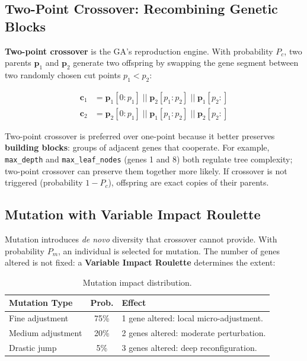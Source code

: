 \documentclass[12pt, a4paper]{article}
\begin{document}
\subsection{Two-Point Crossover: Recombining Genetic Blocks}

\textbf{Two-point crossover} is the GA's reproduction engine. With probability $P_c$,
two parents $\mathbf{p}_1$ and $\mathbf{p}_2$ generate two offspring by swapping the
gene segment between two randomly chosen cut points $p_1 < p_2$:

\begin{align}
  \mathbf{c}_1 & = \mathbf{p}_1[0{:}p_1] \;||\; \mathbf{p}_2[p_1{:}p_2] \;||\; \mathbf{p}_1[p_2{:}] \\
  \mathbf{c}_2 & = \mathbf{p}_2[0{:}p_1] \;||\; \mathbf{p}_1[p_1{:}p_2] \;||\; \mathbf{p}_2[p_2{:}]
\end{align}

Two-point crossover is preferred over one-point because it better preserves
\textbf{building blocks}: groups of adjacent genes that cooperate. For example,
\texttt{max\_depth} and \texttt{max\_leaf\_nodes} (genes 1 and 8) both regulate tree
complexity; two-point crossover can preserve them together more likely. If crossover
is not triggered (probability $1-P_c$), offspring are exact copies of their parents.

\subsection{Mutation with Variable Impact Roulette}

Mutation introduces \textit{de novo} diversity that crossover cannot provide. With
probability $P_m$, an individual is selected for mutation. The number of genes altered
is not fixed: a \textbf{Variable Impact Roulette} determines the extent:

\renewcommand{\arraystretch}{1.2}
\begin{table}[H]
  \centering
  \caption{Mutation impact distribution.}
  \begin{tabular}{lcl}
    \toprule
    \textbf{Mutation Type} & \textbf{Prob.} & \textbf{Effect}                              \\
    \midrule
    Fine adjustment               & 75\%             & 1 gene altered: local micro-adjustment.          \\
    Medium adjustment              & 20\%             & 2 genes altered: moderate perturbation.    \\
    Drastic jump            & 5\%              & 3 genes altered: deep reconfiguration. \\
    \bottomrule
  \end{tabular}
\end{table}
\renewcommand{\arraystretch}{1}
\end{document}
